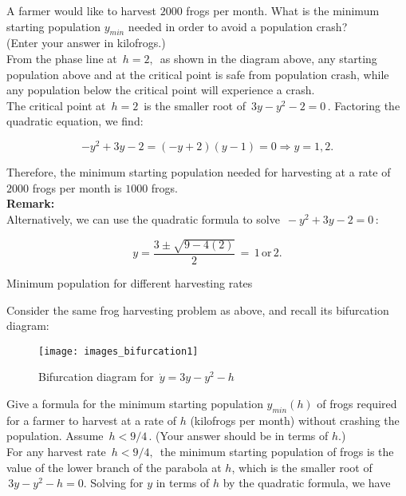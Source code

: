 A farmer would like to harvest $2000$ frogs per month.
What is the minimum starting population $y_{min}$ needed in order to avoid a population crash? \\
(Enter your answer in kilofrogs.) \\

From the phase line at $\, h=2, \,$ as shown in the diagram above,
any starting population above and at the critical point is safe from population crash,
while any population below the critical point will experience a crash.\\
The critical point at $\, h = 2\,$ is
the smaller root of $\, 3y - y^2 - 2=0\,$. Factoring the quadratic equation, we find:

\begin{equation*}
  \displaystyle  -y^2+3y-2=(-y+2)(y-1)=0
  \displaystyle \Longrightarrow y=1, 2.
\end{equation*}

Therefore, the minimum starting population needed
for harvesting at a rate of $2000$ frogs per month is $1000$ frogs. \\
\textbf{Remark:}\\
Alternatively, we can use the quadratic formula to solve $\, -y^2 + 3y -2 = 0 \,$:

\begin{equation*}
  \displaystyle  y = \frac{3 \pm \sqrt {9 - 4(2)}}{2}\, =\, 1\, \text {or}\,  2.
\end{equation*}

\begin{exercise}
  Minimum population for different harvesting rates
\end{exercise}

Consider the same frog harvesting problem as above, and recall its bifurcation diagram:

\begin{figure}[ht!]
  \centering
  \texttt{[image: images\_bifurcation1]}
  \caption{Bifurcation diagram for $\, \dot y = 3y - y^2 - h\,$}
\end{figure}

Give a formula for the minimum starting population $y_{min} (h)$
of frogs required for a farmer to harvest at a rate of $h$ (kilofrogs per month)
without crashing the population. Assume $\, h < 9/4 \,$.
(Your answer should be in terms of $h$.)\\

For any harvest rate $\, h < 9/4,\,$
the minimum starting population of frogs is the value of the lower branch of the parabola at $h$,
which is the smaller root of $\, 3y - y^2 - h = 0$.
Solving for $y$ in terms of $h$ by the quadratic formula, we have

